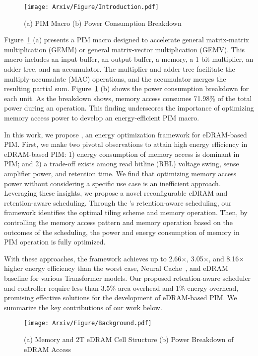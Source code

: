\begin{figure}[t]
\centering
\texttt{[image: Arxiv/Figure/Introduction.pdf]}
\caption{(a) PIM Macro (b) Power Consumption Breakdown}
\vspace{-0.1in}
\label{figure1}
\end{figure}

Figure~\ref{figure1} (a) presents a PIM macro designed to accelerate general matrix-matrix multiplication (GEMM) or general matrix-vector multiplication (GEMV). This macro includes an input buffer, an output buffer, a memory, a 1-bit multiplier, an adder tree, and an accumulator. The multiplier and adder tree facilitate the multiply-accumulate (MAC) operations, and the accumulator merges the resulting partial sum. Figure~\ref{figure1} (b) shows the power consumption breakdown for each unit. As the breakdown shows, memory access consumes 71.98\% of the total power during an operation. This finding underscores the importance of optimizing memory access power to develop an energy-efficient PIM macro.

In this work, we propose \sysname, an energy optimization framework for eDRAM-based PIM. %
First, we make two pivotal observations to attain high energy efficiency in eDRAM-based PIM: 1) energy consumption of memory access is dominant in PIM; and 2) a trade-off exists among read bitline (RBL) voltage swing, sense amplifier power, and retention time. We find that optimizing memory access power without considering a specific use case is an inefficient approach. Leveraging these insights, we propose a novel reconfigurable eDRAM and retention-aware scheduling. Through the \sysname's retention-aware scheduling, our framework identifies the optimal tiling scheme and memory operation. Then, by controlling the memory access pattern and memory operation based on the outcomes of the scheduling, the power and energy consumption of memory in PIM operation is fully optimized. 

With these approaches, the \sysname framework achieves up to 2.66$\times$, 3.05$\times$, and 8.16$\times$ higher energy efficiency than the worst case, Neural Cache~\cite{eckert2018neural}, and eDRAM baseline for various Transformer models. Our proposed retention-aware scheduler and controller require less than 3.5\% area overhead and 1\% energy overhead, promising effective solutions for the development of eDRAM-based PIM. We summarize the key contributions of our work below.
\begin{figure}[t]
\centering
\texttt{[image: Arxiv/Figure/Background.pdf]}
\caption{(a) Memory and 2T eDRAM Cell Structure (b) Power Breakdown of eDRAM Access}
\label{figure2}
\end{figure}

